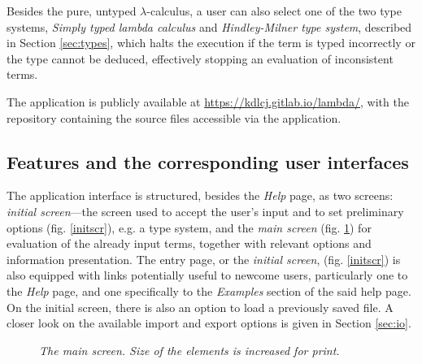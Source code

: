 \documentclass[table, a4paper, 10pt]{article}
\begin{document}
Besides the pure, untyped $\lambda$-calculus, a user can also select one of the two
type systems, \textit{Simply typed lambda calculus} and \textit{Hindley-Milner type system},
described in Section \ref{sec:types}, which halts the execution if the term is typed incorrectly or the type cannot
be deduced, effectively stopping an evaluation of inconsistent terms.

The application is publicly available at \url{https://kdlcj.gitlab.io/lambda/},
with the repository containing the source files accessible via the application.

\subsection{Features and the corresponding user interfaces}
The application interface is structured, besides the \textit{Help} page,
as two screens: \textit{initial screen}---the screen
used to accept the user's input and to set preliminary options (fig. \ref{initscr}), e.g. a type system, and
the \textit{main screen} (fig. \ref{mainscrfig}) for evaluation of the already input terms,
together with relevant options and information presentation.
The entry page, or the \textit{initial screen}, (fig. \ref{initscr}) is
also equipped with links potentially useful
to newcome users, particularly one to the \textit{Help} page, and one specifically
to the \textit{Examples} section of the said help page. On the initial screen, there is
also an option to load a previously saved file. A closer look on
the available import and export options is given in Section \ref{sec:io}.

\begin{center}
\begin{figure}[H]\centering
{}
\caption{\textit{The main screen. Size of the elements is increased for print.}}\label{mainscrfig}
\end{figure}
\end{center}
\end{document}
